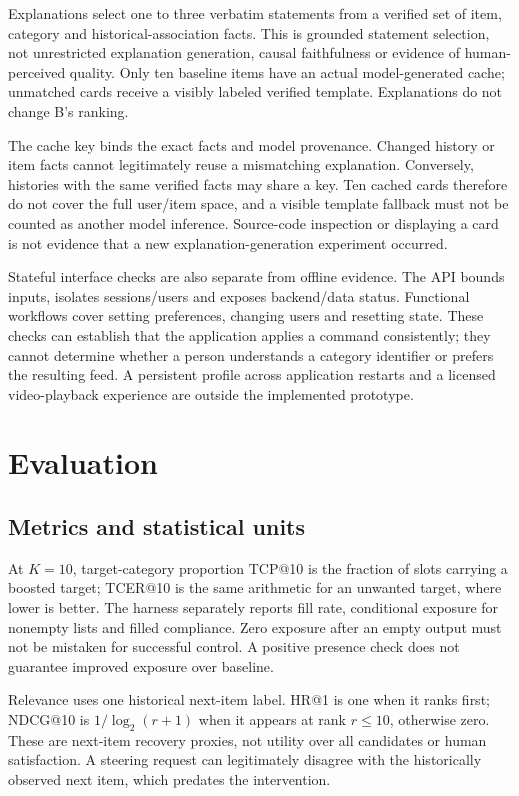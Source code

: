 \documentclass[conference]{IEEEtran}
\begin{document}
Explanations select one to three verbatim statements from a verified set of item, category and historical-association facts. This is grounded statement selection, not unrestricted explanation generation, causal faithfulness or evidence of human-perceived quality. Only ten baseline items have an actual model-generated cache; unmatched cards receive a visibly labeled verified template. Explanations do not change B's ranking.

The cache key binds the exact facts and model provenance. Changed history or item facts cannot legitimately reuse a mismatching explanation. Conversely, histories with the same verified facts may share a key. Ten cached cards therefore do not cover the full user/item space, and a visible template fallback must not be counted as another model inference. Source-code inspection or displaying a card is not evidence that a new explanation-generation experiment occurred.

Stateful interface checks are also separate from offline evidence. The API bounds inputs, isolates sessions/users and exposes backend/data status. Functional workflows cover setting preferences, changing users and resetting state. These checks can establish that the application applies a command consistently; they cannot determine whether a person understands a category identifier or prefers the resulting feed. A persistent profile across application restarts and a licensed video-playback experience are outside the implemented prototype.

\section{Evaluation}
\subsection{Metrics and statistical units}
At $K=10$, target-category proportion TCP@10 is the fraction of slots carrying a boosted target; TCER@10 is the same arithmetic for an unwanted target, where lower is better. The harness separately reports fill rate, conditional exposure for nonempty lists and filled compliance. Zero exposure after an empty output must not be mistaken for successful control. A positive presence check does not guarantee improved exposure over baseline.

Relevance uses one historical next-item label. HR@1 is one when it ranks first; NDCG@10 is $1/\log_2(r+1)$ when it appears at rank $r\leq10$, otherwise zero. These are next-item recovery proxies, not utility over all candidates or human satisfaction. A steering request can legitimately disagree with the historically observed next item, which predates the intervention.
\end{document}

